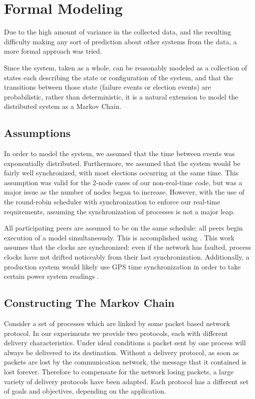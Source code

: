 \section{Formal Modeling}

Due to the high amount of variance in the collected data, and the resulting
difficulty making any sort of prediction about other systems from the data, a
more formal approach was tried.

Since the system, taken as a whole, can be reasonably modeled as a collection of 
states each describing the state or configuration of the system, and that the
transitions between those state (failure events or election events) are probabilistic,
rather than deterministic, it is a natural extension to model the distributed
system as a Markov Chain.

\subsection{Assumptions}
In order to model the system, we assumed that the time between events was 
exponentially distributed. Furthermore, we assumed that the system would be
fairly well synchronized, with most elections occurring at the same time. This
assumption was valid for the 2-node cases of our non-real-time code, but was
a major issue as the number of nodes began to increase. However, with
the use of the round-robin scheduler with synchronization to enforce our
real-time requirements, assuming the synchronization of processes is not a
major leap.

All participating peers are assumed to be on the same schedule: all
peers begin execution of a model simultaneously. This is accomplished using \cite{DCS}.
This work assumes that the clocks are synchronized: even if the network has faulted,
process clocks have not drifted noticeably from their last synchronization. Additionally,
a production system would likely use GPS time synchronization in order to take
certain power system readings \cite{PHASORREADINGS}.

\subsection{Constructing The Markov Chain}

Consider a set of processes which are linked by some packet based network
protocol. In our experiments we provide two protocols, each with different
delivery characteristics. Under ideal conditions a packet sent by one process
will always be delivered to its destination. Without a delivery protocol, as
soon as packets are lost by the communication network, the message that it
contained is lost forever. Therefore to compensate for the network losing
packets, a large variety of delivery protocols have been adapted. Each protocol
has a different set of goals and objectives, depending on the application.

